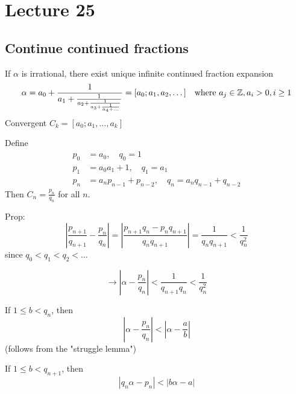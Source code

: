 \chapter{Lecture 25}
\date{December 3, 2024}

\section{Continue continued fractions}
    If $\alpha$ is irrational, there exist unique infinite continued fraction expansion 
    \[
        \alpha = a_0 + \frac{1}{a_1 + \frac{1}{a_2 + \frac{1}{a_3 + \frac{1}{a_4 + \dots}}}} = [a_0; a_1, a_2, \dots] \quad\text{where } a_j\in\mathbb{Z}, a_i > 0, i\ge 1
    \]
    Convergent $C_k = [a_0; a_1, \dots, a_k]$

    \begin{theorem}
        Define 
        \begin{align*}
            p_0 &= a_0, \quad q_0 = 1 \\
            p_1 &= a_0a_1 + 1, \quad q_1 = a_1 \\
            p_n &= a_np_{n-1} + p_{n-2}, \quad q_n = a_nq_{n-1}+q_{n-2}
        \end{align*}
        Then $C_n = \frac{p_n}{q_n}$ for all $n$. 
    \end{theorem}

    Prop: 
    \[
        |\frac{p_{n+1}}{q_{n+1}} - \frac{p_n}{q_n}| = |\frac{p_{n+1}q_n - p_nq_{n+1}}{q_nq_{n+1}}| = \frac{1}{q_nq_{n+1}} < \frac{1}{q_n^2}
    \]
    since $q_0 < q_1 < q_2 < \dots$

    \[
        \rightarrow |\alpha - \frac{p_n}{q_n}| < \frac{1}{q_{n+1}q_n} < \frac{1}{q_n^2}
    \]

    \begin{theorem}
        If $1 \le b < q_n$, then 
        \[
            |\alpha - \frac{p_n}{q_n}| < |\alpha - \frac{a}{b}|
        \]
        (follows from the "struggle lemma")
    \end{theorem}

    \begin{lemma}
        If $1\le b < q_{n+1}$, then 
        \[
            |q_n \alpha - p_n| < |b\alpha - a|
        \]
    \end{lemma}